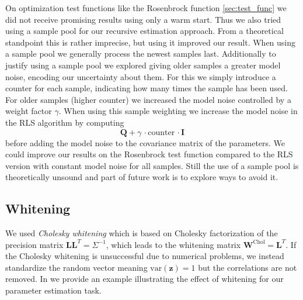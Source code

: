 On optimization test functions like the Rosenbrock
function \cref{sec:test_func} we did not receive
promising results using only a warm start.
Thus we also tried using a sample pool for our recursive estimation approach.
From a theoretical standpoint this is rather imprecise,
but using it improved our result.
When using a sample pool we generally process the newest samples
last. Additionally to justify using a sample pool
we explored giving older samples 
a greater model noise,  encoding our uncertainty about them.
For this we simply introduce a counter for each sample,
indicating how many times the sample has been used.
For older samples (higher counter) we increased the model noise controlled
by a weight factor $\gamma$.
When using this sample weighting we increase the model noise in the
RLS algorithm by computing
$$ \mathbf{Q} + \gamma \,\cdot \text{counter} \, \cdot \mathbf{I} $$
before adding the model noise to the covariance
matrix of the parameters.
We could improve our results on the Rosenbrock test function compared
to the RLS version with constant model noise for all samples.
Still the use of a sample pool is theoretically unsound and part
of future work is to explore ways to avoid it.

%
%
%
%
\subsection{Whitening}
We used \textit{Cholesky whitening} which is based on
Cholesky factorization of the precision matrix
$\mathbf{L}\mathbf{L}^T = \Sigma^{-1}$, which leads to the whitening
matrix $\mathbf{W}^{\text{Chol}} = \mathbf{L}^T$.
If the Cholesky whitening is unsuccessful due to numerical problems,
we instead standardize
the random vector meaning $\text{var}(\mathbf{z}) = 1$ but the correlations
are not removed.
In  we provide an example illustrating the effect of 
whitening for our parameter estimation task.

